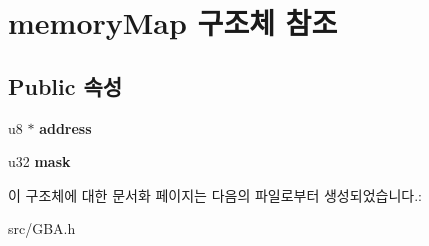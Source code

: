 \hypertarget{structmemory_map}{}\section{memory\+Map 구조체 참조}
\label{structmemory_map}
\subsection*{Public 속성}
\begin{DoxyCompactItemize}
\item 
\mbox{\label{structmemory_map_ae1937ce06d98a959b8d8d5a9c1642f37}} 
u8 $\ast$ {\bfseries address}
\item 
\mbox{\label{structmemory_map_ad1fc74c431f99d7fe2fbad6d199cfdc0}} 
u32 {\bfseries mask}
\end{DoxyCompactItemize}


이 구조체에 대한 문서화 페이지는 다음의 파일로부터 생성되었습니다.\+:\begin{DoxyCompactItemize}
\item 
src/G\+B\+A.\+h\end{DoxyCompactItemize}
